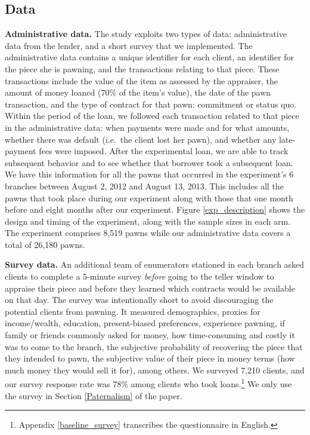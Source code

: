\documentclass[ecta,nameyear,final]{econsocart}
\begin{document}
\subsection{Data}

\noindent \textbf{Administrative data.} The study exploits two types of data: administrative data from the lender, and a short survey that we implemented. The administrative data contains a unique identifier for each client, an identifier for the piece she is pawning, and the transactions relating to that piece. These transactions include the value of the item as assessed by the appraiser, the amount of money loaned (70\% of the item's value), the date of the pawn transaction, and the type of contract for that pawn: commitment or status quo. Within the period of the loan, we followed each transaction related to that piece in the administrative data: when payments were made and for what amounts, whether there was default (i.e.\ the client lost her pawn), and whether any late-payment fees were imposed. After the experimental loan, we are able to track subsequent behavior and to see whether that borrower took a subsequent loan.  We have this information for all the pawns that occurred in the experiment's 6 branches between August 2, 2012 and August 13, 2013. This includes all the pawns that took place during our experiment along with those that one month before and eight months after our experiment. Figure \ref{exp_description} shows the design and timing of the experiment, along with the sample sizes in each arm. The experiment comprises 8,519 pawns while our administrative data covers a total of 26,180 pawns.

\noindent \textbf{Survey data.} An additional team of enumerators stationed in each branch asked clients to complete a 5-minute survey \textit{before} going to the teller window to appraise their piece and before they learned which contracts would be available on that day. The survey was intentionally short to avoid discouraging the potential clients from pawning. It measured demographics, proxies for income/wealth, education, present-biased preferences, experience pawning, if family or friends commonly asked for money, how time-consuming and costly it was to come to the branch, the subjective probability of recovering the piece that they intended to pawn, the subjective value of their piece in money terms (how much money they would sell it for), among others. We surveyed 7,210 clients, and our survey response rate was 78\% among clients who took loans.\footnote{Appendix \ref{baseline_survey} transcribes the questionnaire in English.} %
We only use the survey in Section \ref{Paternalism} of the paper.
\end{document}
